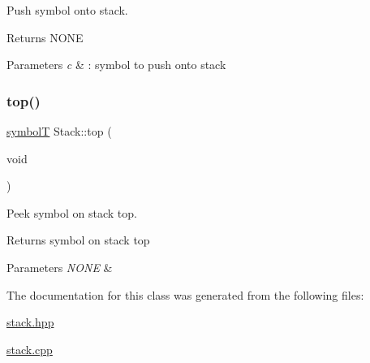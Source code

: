 Push symbol onto stack. 

\begin{DoxyReturn}{Returns}
N\+O\+NE
\end{DoxyReturn}

\begin{DoxyParams}{Parameters}
{\em c} & \+: symbol to push onto stack \\
\hline
\end{DoxyParams}
\mbox{\label{classStack_a5e190884440b0eed5edf06f31d70244f}} 
\subsubsection{\texorpdfstring{top()}{top()}}
{\footnotesize\ttfamily \hyperlink{structsymbolT}{symbolT} Stack\+::top (\begin{DoxyParamCaption}\item[{void}]{ }\end{DoxyParamCaption})}



Peek symbol on stack top. 

\begin{DoxyReturn}{Returns}
symbol on stack top
\end{DoxyReturn}

\begin{DoxyParams}{Parameters}
{\em N\+O\+NE} & \\
\hline
\end{DoxyParams}


The documentation for this class was generated from the following files\+:\begin{DoxyCompactItemize}
\item 
\hyperlink{stack_8hpp}{stack.\+hpp}\item 
\hyperlink{stack_8cpp}{stack.\+cpp}\end{DoxyCompactItemize}
